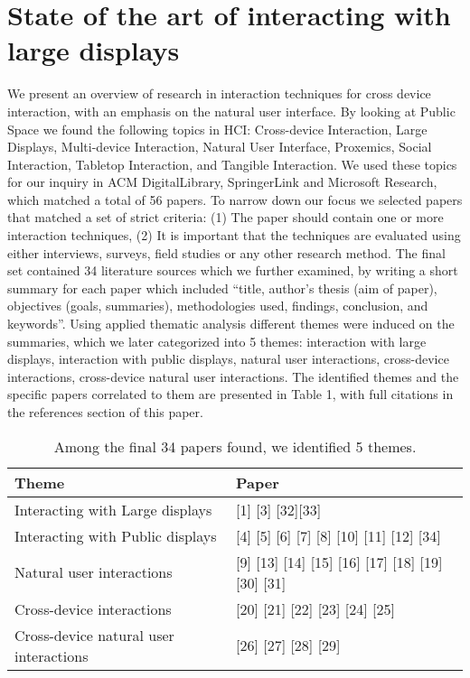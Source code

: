 \section{State of the art of interacting with large displays}
We present an overview of research in interaction techniques for cross device interaction, with an emphasis on the natural user interface.
By looking at Public Space we found the following topics in HCI: Cross-device Interaction, Large Displays, Multi-device Interaction, Natural User Interface, Proxemics, Social Interaction, Tabletop Interaction, and Tangible Interaction. 
We used these topics for our inquiry in ACM DigitalLibrary, SpringerLink and Microsoft Research, which matched a total of 56 papers. 
To narrow down our focus we selected papers that matched a set of strict criteria: (1) The paper should contain one or more interaction techniques, (2) It is important that the techniques are evaluated using either interviews, surveys, field studies or any other research method.
The final set contained 34 literature sources which we further examined, by writing a short summary for each paper which included ``title, author's thesis (aim of paper), objectives (goals, summaries), methodologies used, findings, conclusion, and keywords''. 
Using applied thematic analysis different themes were induced on the summaries, which we later categorized into 5 themes: interaction with large displays, interaction with public displays, natural user interactions, cross-device interactions, cross-device natural user interactions.
The identified themes and the specific papers correlated to them are presented in Table 1, with full citations in the references section of this paper. 

\begin{table*}[t]
\centering
\begin{tabular}{@{}ll@{}}
\toprule
Theme & Paper \\ \midrule
Interacting with Large displays      &      [1] [3] [32][33] \\
Interacting with Public displays      &       [4] [5] [6] [7] [8] [10] [11] [12] [34] \\
Natural user interactions      &      [9] [13] [14] [15] [16] [17] [18] [19] [30] [31] \\
Cross-device interactions      &      [20] [21] [22] [23] [24] [25] \\
Cross-device natural user interactions      &      [26] [27] [28] [29] \\ \bottomrule
\end{tabular}
\caption{Among the final 34 papers found, we identified 5 themes.}
\label{table:themes}
\end{table*}






